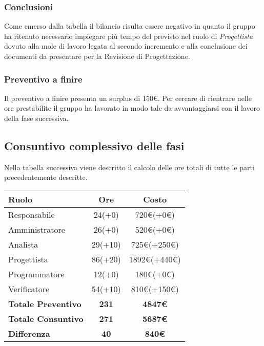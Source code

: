 {{{{{\subsubsection{Conclusioni}
Come emerso dalla tabella il bilancio risulta essere negativo in quanto il gruppo ha ritenuto necessario impiegare più tempo del previsto nel ruolo di \textit{Progettista} dovuto alla mole di lavoro legata al secondo incremento e alla conclusione dei documenti da presentare per la Revisione di Progettazione.

\subsubsection{Preventivo a finire}
Il preventivo a finire presenta un surplus di 150\euro. Per cercare di rientrare nelle ore prestabilite il gruppo ha lavorato in modo tale da avvantaggiarsi con il lavoro della fase successiva.

\subsection{Consuntivo complessivo delle fasi}\label{ConsuntivoPeriodoDiProgettazioneArchitetturaleConsuntivoComplessivoDelleFasi}

Nella tabella successiva viene descritto il calcolo delle ore totali di tutte le parti precedentemente descritte.

\quad
\def\tabularxcolumn#1{m{#1}}
{
	\begin{center}
		\renewcommand{\arraystretch}{1.4}
		\begin{tabularx}{10cm}{|X|c|c|}
			\hline
			\rowcolor{airforceblue}
			\textbf{Ruolo} & \textbf{Ore} & \textbf{Costo}\\
			\hline
			Responsabile & 24(+0) & 720\euro(+0\euro)\\
			\hline
			Amministratore & 26(+0) & 520\euro(+0\euro)\\
			\hline
			Analista & 29(+10) & 725\euro(+250\euro)\\
			\hline
			Progettista & 86(+20) & 1892\euro(+440\euro)\\
			\hline
			Programmatore & 12(+0) & 180\euro(+0\euro)\\
			\hline
			Verificatore & 54(+10) & 810\euro(+150\euro)\\
			\hline
			\textbf{Totale Preventivo} & \textbf{231} & \textbf{4847\euro}\\
			\hline
			\textbf{Totale Consuntivo} & \textbf{271} & \textbf{5687\euro}\\
			\hline
			\textbf{Differenza} & \textbf{40} & \textbf{840\euro}
		\end{tabularx}
	\end{center}

}}}}}}
